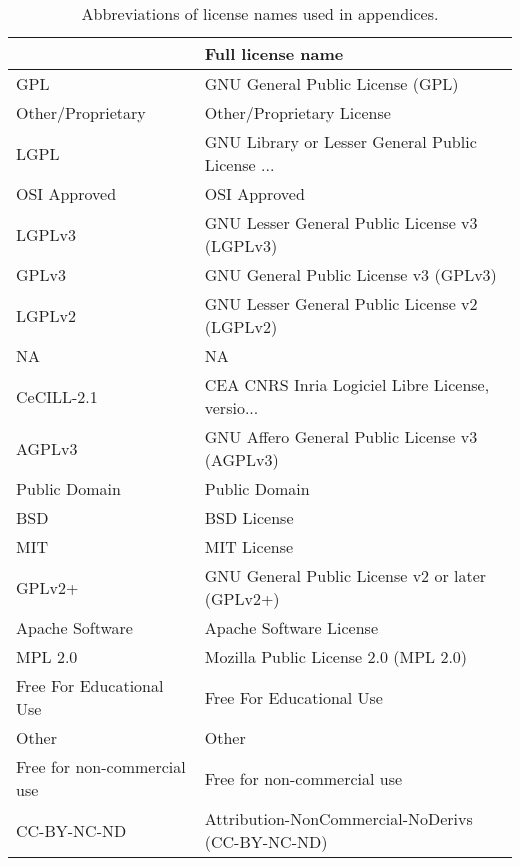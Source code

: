 \begin{table}
\centering
\caption{Abbreviations of license names used in appendices.}
\label{tab:keys-licenses}
\begin{tabular}{ll}
\toprule
{} &                                  Full license name \\
\midrule
GPL                          &                   GNU General Public License (GPL) \\
 Other/Proprietary           &                          Other/Proprietary License \\
LGPL                         &   GNU Library or Lesser General Public License ... \\
 OSI Approved                &                                       OSI Approved \\
LGPLv3                       &      GNU Lesser General Public License v3 (LGPLv3) \\
GPLv3                        &              GNU General Public License v3 (GPLv3) \\
LGPLv2                       &      GNU Lesser General Public License v2 (LGPLv2) \\
 NA                          &                                                 NA \\
CeCILL-2.1                   &   CEA CNRS Inria Logiciel Libre License, versio... \\
AGPLv3                       &      GNU Affero General Public License v3 (AGPLv3) \\
 Public Domain               &                                      Public Domain \\
 BSD                         &                                        BSD License \\
 MIT                         &                                        MIT License \\
GPLv2+                       &    GNU General Public License v2 or later (GPLv2+) \\
 Apache Software             &                            Apache Software License \\
MPL 2.0                      &               Mozilla Public License 2.0 (MPL 2.0) \\
 Free For Educational Use    &                           Free For Educational Use \\
 Other                       &                                              Other \\
 Free for non-commercial use &                        Free for non-commercial use \\
CC-BY-NC-ND                  &   Attribution-NonCommercial-NoDerivs (CC-BY-NC-ND) \\
\bottomrule
\end{tabular}
\end{table}

